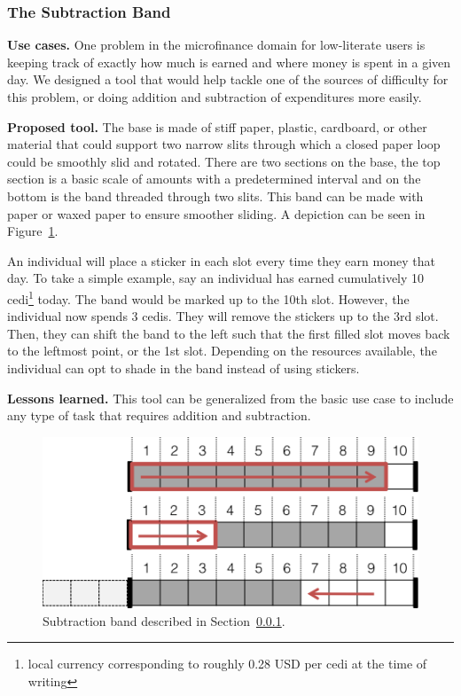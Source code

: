 \documentclass{sig-alternate}
\begin{document}
\subsubsection{The Subtraction Band}
\label{sec:subtraction}

\textbf{Use cases.}
One problem in the microfinance domain for low-literate users is keeping track of exactly how much is earned and where money is spent in a given day. We designed a tool that would help tackle one of the sources of difficulty for this problem, or doing addition and subtraction of expenditures more easily.

\textbf{Proposed tool.}
The base is made of stiff paper, plastic, cardboard, or other material that could support two narrow slits through which a closed paper loop could be smoothly slid and rotated. There are two sections on the base, the top section is a basic scale of amounts with a predetermined interval and on the bottom is the band threaded through two slits. This band can be made with paper or waxed paper to ensure smoother sliding. A depiction can be seen in Figure~\ref{fig:band}.

An individual will place a sticker in each slot every time they earn money that day. To take a simple example, say an individual has earned cumulatively 10 cedi\footnote{local currency corresponding to roughly 0.28 USD per cedi at the time of writing} today. The band would be marked up to the 10th slot. However, the individual now spends 3 cedis. They will remove the stickers up to the 3rd slot. Then, they can shift the band to the left such that the first filled slot moves back to the leftmost point, or the 1st slot.
Depending on the resources available, the individual can opt to shade in the band instead of using stickers.

\textbf{Lessons learned.}
This tool can be generalized from the basic use case to include any type of task that requires addition and subtraction. 

\begin{figure}
\centering
\includegraphics[width=.7\linewidth]{img/band.png}
\caption{Subtraction band described in Section~\ref{sec:subtraction}.}
\label{fig:band}
\end{figure}
\end{document}
